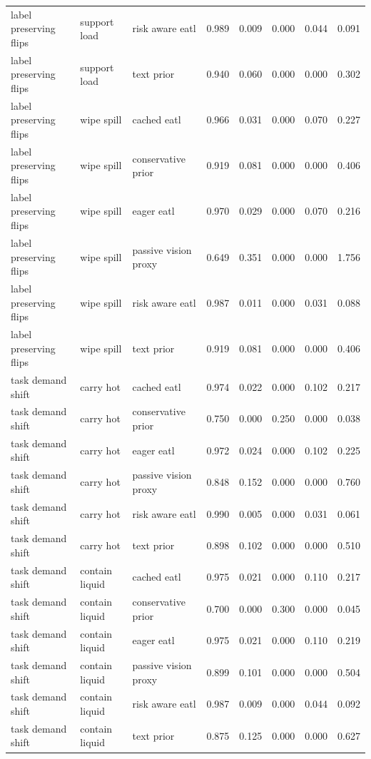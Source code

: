 \begin{longtable}{lllrrrrr}
label preserving flips & support load & risk aware eatl & 0.989 & 0.009 & 0.000 & 0.044 & 0.091 \\
label preserving flips & support load & text prior & 0.940 & 0.060 & 0.000 & 0.000 & 0.302 \\
\midrule
label preserving flips & wipe spill & cached eatl & 0.966 & 0.031 & 0.000 & 0.070 & 0.227 \\
label preserving flips & wipe spill & conservative prior & 0.919 & 0.081 & 0.000 & 0.000 & 0.406 \\
label preserving flips & wipe spill & eager eatl & 0.970 & 0.029 & 0.000 & 0.070 & 0.216 \\
label preserving flips & wipe spill & passive vision proxy & 0.649 & 0.351 & 0.000 & 0.000 & 1.756 \\
label preserving flips & wipe spill & risk aware eatl & 0.987 & 0.011 & 0.000 & 0.031 & 0.088 \\
label preserving flips & wipe spill & text prior & 0.919 & 0.081 & 0.000 & 0.000 & 0.406 \\
\midrule
task demand shift & carry hot & cached eatl & 0.974 & 0.022 & 0.000 & 0.102 & 0.217 \\
task demand shift & carry hot & conservative prior & 0.750 & 0.000 & 0.250 & 0.000 & 0.038 \\
task demand shift & carry hot & eager eatl & 0.972 & 0.024 & 0.000 & 0.102 & 0.225 \\
task demand shift & carry hot & passive vision proxy & 0.848 & 0.152 & 0.000 & 0.000 & 0.760 \\
task demand shift & carry hot & risk aware eatl & 0.990 & 0.005 & 0.000 & 0.031 & 0.061 \\
task demand shift & carry hot & text prior & 0.898 & 0.102 & 0.000 & 0.000 & 0.510 \\
\midrule
task demand shift & contain liquid & cached eatl & 0.975 & 0.021 & 0.000 & 0.110 & 0.217 \\
task demand shift & contain liquid & conservative prior & 0.700 & 0.000 & 0.300 & 0.000 & 0.045 \\
task demand shift & contain liquid & eager eatl & 0.975 & 0.021 & 0.000 & 0.110 & 0.219 \\
task demand shift & contain liquid & passive vision proxy & 0.899 & 0.101 & 0.000 & 0.000 & 0.504 \\
task demand shift & contain liquid & risk aware eatl & 0.987 & 0.009 & 0.000 & 0.044 & 0.092 \\
task demand shift & contain liquid & text prior & 0.875 & 0.125 & 0.000 & 0.000 & 0.627 \\

\end{longtable}
